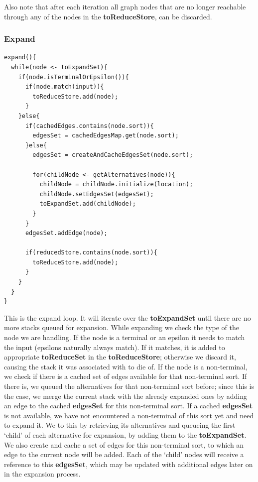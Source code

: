 \documentclass[a4paper,10pt]{article}
\begin{document}
Also note that after each iteration all graph nodes that are no longer reachable through any of the nodes in the {\bf toReduceStore}, can be discarded.

\pagebreak
\subsubsection{Expand}
\label{subsubsec:psuedocodeExpand}
{\small
\begin{verbatim}
expand(){
  while(node <- toExpandSet){
    if(node.isTerminalOrEpsilon()){
      if(node.match(input)){
        toReduceStore.add(node);
      }
    }else{
      if(cachedEdges.contains(node.sort)){
        edgesSet = cachedEdgesMap.get(node.sort);
      }else{
        edgesSet = createAndCacheEdgesSet(node.sort);
        
        for(childNode <- getAlternatives(node)){
          childNode = childNode.initialize(location);
          childNode.setEdgesSet(edgesSet);
          toExpandSet.add(childNode);
        }
      }
      edgesSet.addEdge(node);
      
      if(reducedStore.contains(node.sort)){
        toReduceStore.add(node);
      }
    }
  }
}
\end{verbatim}
}

This is the expand loop. It will iterate over the {\bf toExpandSet} until there are no more stacks queued for expansion. While expanding we check the type of the node we are handling. If the node is a terminal or an epsilon it needs to match the input (epsilons naturally always match). If it matches, it is added to appropriate {\bf toReduceSet} in the {\bf toReduceStore}; otherwise we discard it, causing the stack it was associated with to die of. If the node is a non-terminal, we check if there is a cached set of edges available for that non-terminal sort. If there is, we queued the alternatives for that non-terminal sort before; since this is the case, we merge the current stack with the already expanded ones by adding an edge to the cached {\bf edgesSet} for this non-terminal sort. If a cached {\bf edgesSet} is not available, we have not encountered a non-terminal of this sort yet and need to expand it. We to this by retrieving its alternatives and queueing the first `child' of each alternative for expansion, by adding them to the {\bf toExpandSet}. We also create and cache a set of edges for this non-terminal sort, to which an edge to the current node will be added. Each of the `child' nodes will receive a reference to this {\bf edgesSet}, which may be updated with additional edges later on in the expansion process.
\end{document}
